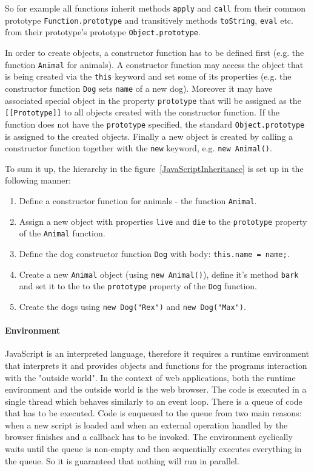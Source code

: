 \documentclass[12pt,a4paper]{report}
\begin{document}
So for example all functions inherit methods \texttt{apply} and \texttt{call} from their common prototype \texttt{Function.prototype} and transitively methods \texttt{toString}, \texttt{eval} etc. from their prototype's prototype \texttt{Object.prototype}.

In order to create objects, a constructor function has to be defined first (e.g. the function \texttt{Animal} for animals). A constructor function may access the object that is being created via the \texttt{this} keyword and set some of its properties (e.g. the constructor function \texttt{Dog} sets \texttt{name} of a new dog). Moreover it may have associated special object in the property \texttt{prototype} that will be assigned as the \texttt{[[Prototype]]} to all objects created with the constructor function. If the function does not have the \texttt{prototype} specified, the standard \texttt{Object.prototype} is assigned to the created objects. Finally a new object is created by calling a constructor function together with the \texttt{new} keyword, e.g. \texttt{new Animal()}.

To sum it up, the hierarchy in the figure~\ref{JavaScriptInheritance} is set up in the following manner:

\begin{enumerate}
\item Define a constructor function for animals - the function \texttt{Animal}.
\item Assign a new object with properties \texttt{live} and \texttt{die} to the \texttt{prototype} property of the \texttt{Animal} function.
\item Define the dog constructor function \texttt{Dog} with body: \texttt{this.name = name;}.
\item Create a new \texttt{Animal} object (using \texttt{new Animal()}), define it's method \texttt{bark} and set it to the to the \texttt{prototype} property of the \texttt{Dog} function.
\item Create the dogs using \texttt{new Dog("Rex")} and \texttt{new Dog("Max")}.
\end{enumerate}

\paragraph{Environment} JavaScript is an interpreted language, therefore it requires a runtime environment that interprets it and provides objects and functions for the programs interaction with the "outside world". In the context of web applications, both the runtime environment and the outside world is the web browser. The code is executed in a single thread which behaves similarly to an event loop. There is a queue of code that has to be executed. Code is enqueued to the queue from two main reasons: when a new script is loaded and when an external operation handled by the browser finishes and a callback has to be invoked. The environment cyclically waits until the queue is non-empty and then sequentially executes everything in the queue. So it is guaranteed that nothing will run in parallel.
\end{document}

